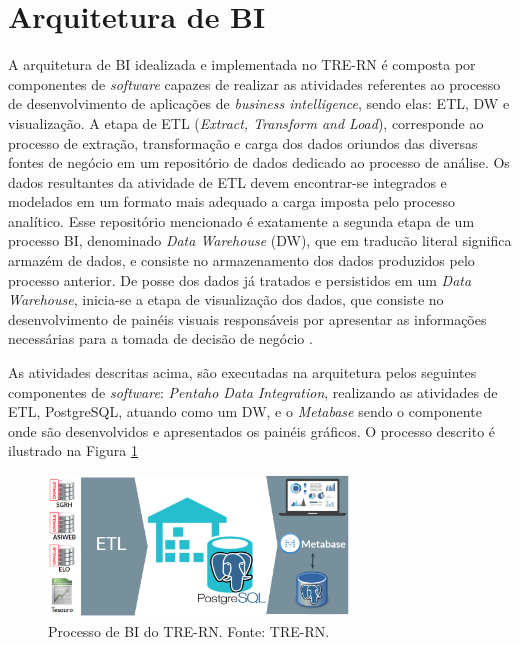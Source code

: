 \section{Arquitetura de BI}
A arquitetura de BI idealizada e implementada no TRE-RN é composta por componentes de \textit{software} capazes de realizar as atividades referentes ao processo de desenvolvimento de aplicações de \textit{business intelligence}, sendo elas: ETL, DW e visualização.
A etapa de ETL (\textit{Extract, Transform and Load}), corresponde ao processo de extração, transformação e carga dos dados oriundos das diversas fontes de negócio em um repositório de dados dedicado ao processo de análise. Os dados resultantes da atividade de ETL devem encontrar-se integrados e modelados em um formato mais adequado a carga imposta pelo processo analítico. 
Esse repositório mencionado é exatamente a segunda etapa de um processo BI, denominado \textit{Data Warehouse} (DW), que em traducão literal significa armazém de dados, e consiste no armazenamento dos dados produzidos pelo processo anterior.
De posse dos dados já tratados e persistidos em um \textit{Data Warehouse}, inicia-se a etapa de visualização dos dados, que consiste no desenvolvimento de painéis visuais responsáveis por apresentar as informações necessárias para a tomada de decisão de negócio \cite{BIProcess}.

As atividades descritas acima, são executadas na arquitetura pelos seguintes componentes de \textit{software}: \textit{Pentaho Data Integration}, realizando as atividades de ETL, PostgreSQL, atuando como um DW, e o \textit{Metabase} sendo o componente onde são desenvolvidos e apresentados os painéis gráficos. O processo descrito é ilustrado na Figura \ref{fig:modelo_referencia}

\begin{figure}[htp]
   \centering
    \includegraphics[width=8cm]{Imagens/Arq_TRE}
    \caption{Processo de BI do TRE-RN. Fonte: TRE-RN.}
    \label{fig:modelo_referencia}
\end{figure} 

